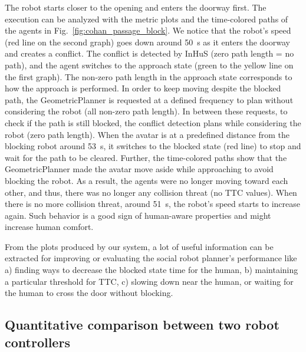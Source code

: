 The robot starts closer to the opening and enters the doorway first. The execution can be analyzed with the metric plots and the time-colored paths of the agents in Fig.~\ref{fig:cohan_passage_block}. We notice that the robot's speed (red line on the second graph) goes down around \SI{50}{\second} as it enters the doorway and creates a conflict. The conflict is detected by InHuS (zero path length = no path), and the agent switches to the approach state (green to the yellow line on the first graph).
The non-zero path length in the approach state corresponds to how the approach is performed. In order to keep moving despite the blocked path, the GeometricPlanner is requested at a defined frequency to plan without considering the robot (all non-zero path length). In between these requests, to check if the path is still blocked, the conflict detection plans while considering the robot (zero path length). When the avatar is at a predefined distance from the blocking robot around \SI{53}{\second}, it switches to the blocked state (red line) to stop and wait for the path to be cleared. Further, the time-colored paths show that the GeometricPlanner made the avatar move aside while approaching to avoid blocking the robot. As a result, the agents were no longer moving toward each other, and thus, there was no longer any collision threat (no TTC values). When there is no more collision threat, around \SI{51}{\second}, the robot's speed starts to increase again. Such behavior is a good sign of human-aware properties and might increase human comfort.

From the plots produced by our system, a lot of useful information can be extracted for improving or evaluating the social robot planner's performance like a) finding ways to decrease the blocked state time for the human, b) maintaining a particular threshold for TTC, c) slowing down near the human, or waiting for the human to cross the door without blocking.


\subsection{Quantitative comparison between two robot controllers}


